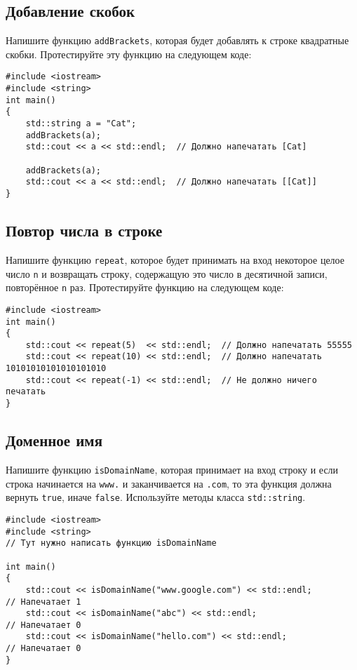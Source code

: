 \documentclass{article}
\begin{document}
\subsection{Добавление скобок}
Напишите функцию \texttt{addBrackets}, которая будет добавлять к строке квадратные скобки. Протестируйте эту функцию на следующем коде:
\begin{lstlisting}
#include <iostream>
#include <string>
int main()
{
	std::string a = "Cat";
	addBrackets(a);
	std::cout << a << std::endl;  // Должно напечатать [Cat]
	
	addBrackets(a);
	std::cout << a << std::endl;  // Должно напечатать [[Cat]]
}
\end{lstlisting}

\subsection{Повтор числа в строке}
Напишите функцию \texttt{repeat}, которое будет принимать на вход некоторое целое число \texttt{n} и возвращать строку, содержащую это число в десятичной записи, повторённое \texttt{n} раз. Протестируйте функцию на следующем коде:
\begin{lstlisting}
#include <iostream>
int main()
{
	std::cout << repeat(5)  << std::endl;  // Должно напечатать 55555
	std::cout << repeat(10) << std::endl;  // Должно напечатать 10101010101010101010
	std::cout << repeat(-1) << std::endl;  // Не должно ничего печатать
}
\end{lstlisting}

\subsection{Доменное имя}
Напишите функцию \texttt{isDomainName}, которая принимает на вход строку и если строка начинается на \texttt{www.} и заканчивается на \texttt{.com}, то эта функция должна вернуть \texttt{true}, иначе \texttt{false}. Используйте методы класса \texttt{std::string}.
\begin{lstlisting}
#include <iostream>
#include <string>
// Тут нужно написать функцию isDomainName

int main()
{
	std::cout << isDomainName("www.google.com") << std::endl;         // Напечатает 1
	std::cout << isDomainName("abc") << std::endl;                    // Напечатает 0
	std::cout << isDomainName("hello.com") << std::endl;              // Напечатает 0
}
\end{lstlisting}
\end{document}
